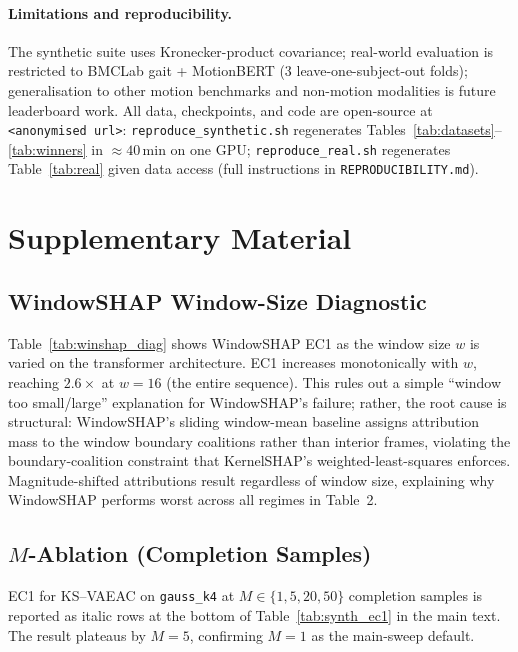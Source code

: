 \documentclass[10pt]{article}
\begin{document}
\paragraph{Limitations and reproducibility.}
The synthetic suite uses Kronecker-product covariance; real-world
evaluation is restricted to BMCLab gait + MotionBERT (3
leave-one-subject-out folds); generalisation to other motion
benchmarks and non-motion modalities is future leaderboard work.  All
data, checkpoints, and code are open-source at
\texttt{<anonymised url>}: \texttt{reproduce\_synthetic.sh} regenerates
Tables~\ref{tab:datasets}--\ref{tab:winners} in $\approx 40$\,min on one
GPU; \texttt{reproduce\_real.sh} regenerates Table~\ref{tab:real} given
data access (full instructions in \texttt{REPRODUCIBILITY.md}).



\appendix
\section*{Supplementary Material}

\subsection*{WindowSHAP Window-Size Diagnostic}
\label{app:winshap}



Table~\ref{tab:winshap_diag} shows WindowSHAP EC1 as the window size $w$
is varied on the transformer architecture.  EC1 increases monotonically
with $w$, reaching $2.6\times$ at $w{=}16$ (the entire sequence).
This rules out a simple ``window too small/large'' explanation for
WindowSHAP's failure; rather, the root cause is structural:
WindowSHAP's sliding window-mean baseline assigns attribution mass to
the window boundary coalitions rather than interior frames, violating
the boundary-coalition constraint that KernelSHAP's weighted-least-squares
enforces.  Magnitude-shifted attributions result regardless of window size,
explaining why WindowSHAP performs worst across all regimes in Table~2.

\subsection*{$M$-Ablation (Completion Samples)}
\label{app:m_ablation}

EC1 for KS--VAEAC on \texttt{gauss\_k4} at $M\in\{1,5,20,50\}$
completion samples is reported as italic rows at the bottom of
Table~\ref{tab:synth_ec1} in the main text.  The result plateaus by
$M{=}5$, confirming $M{=}1$ as the main-sweep default.
\end{document}
